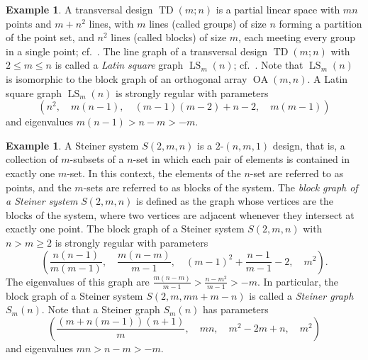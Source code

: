 \documentclass[11pt]{article}
\theoremstyle{definition}
\newtheorem{example}[theo]{Example}
\numberwithin{equation}{section}
\numberwithin{equation}{section}
\begin{document}
\begin{example}
A transversal design $\operatorname{TD}(m;n)$ is a partial linear space with $mn$ points and $m + n^2$ lines, with $m$ lines (called groups) of size $n$ forming a partition of the point set, and $n^2$ lines (called blocks) of size $m$, each meeting every group in a single point; cf.~\cite[Section 8.4.1]{BrVM2022}.
The line graph of a transversal design $\operatorname{TD}(m;n)$ with $2 \leqslant m \leqslant n$ is called a \emph{Latin square} graph $\operatorname{LS}_m(n)$; cf.~\cite[Section 8.4.2]{BrVM2022}.
Note that $\operatorname{LS}_m(n)$ is isomorphic to the block graph of an orthogonal array $\operatorname{OA}(m,n)$.
A Latin square graph $\operatorname{LS}_m(n)$ is strongly regular with parameters
\begin{equation}\label{eq:LS parameters}
	(n^2, \quad m(n-1), \quad (m-1)(m-2)+n-2, \quad m(m-1))
\end{equation}
and eigenvalues $m(n-1)>n-m>-m$.
\end{example}

\begin{example}
A Steiner system $S(2,m,n)$ is a $2$-$(n,m,1)$ design, that is, a collection of $m$-subsets of a $n$-set in which each pair of elements is contained in exactly one $m$-set.
In this context, the elements of the $n$-set are referred to as points, and the $m$-sets are referred to as blocks of the system.
The \emph{block graph of a Steiner system} $S(2, m, n)$ is defined as the graph whose vertices are the blocks of the system, where two vertices are adjacent whenever they intersect at exactly one point.
The block graph of a Steiner system $S(2, m, n)$ with $n>m\geqslant 2$ is strongly regular with parameters
\begin{equation}
	\left(\frac{n(n-1)}{m(m-1)}, \quad \frac{m(n-m)}{m-1}, \quad (m-1)^2 +\frac{n-1}{m-1} -2, \quad m^2\right).
\end{equation}
The eigenvalues of this graph are $\frac{m(n-m)}{m-1} > \frac{n-m^2}{m-1} > -m$.
In particular, the block graph of a Steiner system $S(2, m, mn + m -n)$ is called a \emph{Steiner graph} $S_m(n)$. 
Note that a Steiner graph $S_m(n)$ has parameters
\begin{equation}\label{eq:SG parameters}
	\left( \frac{(m+n(m-1))(n+1)}{m}, \quad mn, \quad m^2-2m+n, \quad m^2 \right)
\end{equation}
and eigenvalues $mn>n-m>-m$.
\end{example}
\end{document}
